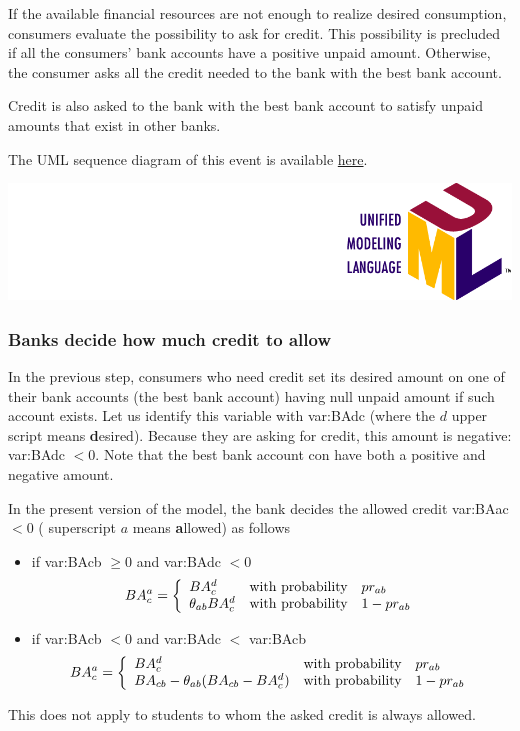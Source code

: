 \documentclass{book}
\newcommand{\doclocation}{file:///Users/giulioni/Documents/workspace/gabriele/docs}
\begin{document}
If the available financial resources are not enough to realize desired consumption, consumers evaluate the possibility to ask for credit. This possibility is precluded if all the consumers' bank accounts have a positive unpaid amount. Otherwise, the consumer asks all the credit needed to the bank with the best bank account. 

Credit is also asked to the bank with the best bank account to satisfy unpaid amounts that exist in other banks. 


The UML sequence diagram of this event is available \href{\doclocation/umldoc/stepDesiredConsumption.html}{here}.
\begin{marginfigure}
	\includegraphics[scale=0.1]{uml.png}
\end{marginfigure}

\subsubsection{Banks decide how much credit to allow}

In the previous step, consumers who need credit set its desired amount on one of their bank accounts (the best bank account) having null unpaid amount if such account exists. Let us identify this variable with \gls{var:BAdc} (where the $d$ upper script means \textbf desired). Because they are asking for credit, this amount is negative:  \gls{var:BAdc} $<0$. Note that the best bank account con have both a positive and negative amount. 

In the present version of the model, the bank decides the allowed credit \gls{var:BAac} $<0$ ( superscript $a$ means \textbf allowed) as follows

\begin{itemize}
	\item if \gls{var:BAcb} $\ge 0$ and \gls{var:BAdc} $<0$
		\[BA^{a}_c=\left\{
			\begin{array}{l l l}
				BA^{d}_c&\textnormal{with probability}&pr_{ab}\\
				\theta_{ab}BA^{d}_c&\textnormal{with probability}&1-pr_{ab}\\
			\end{array}
		\right.
		\]
	\item if \gls{var:BAcb} $< 0$ and \gls{var:BAdc} $<$ \gls{var:BAcb}
		\[BA^{a}_c=\left\{
			\begin{array}{l l l}
				BA^{d}_c&\textnormal{with probability}&pr_{ab}\\
				BA_{cb}-\theta_{ab}(BA_{cb}-BA^{d}_c)&\textnormal{with probability}&1-pr_{ab}\\
			\end{array}
		\right.
		\]
\end{itemize}
This does not apply to students to whom the asked credit is always allowed.
\end{document}
